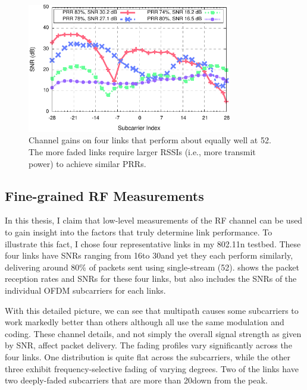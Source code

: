 \begin{figure}[t]
  \centering
  \includegraphics[width=0.8\textwidth]{figures/fsf_shape.pdf}
  \caption[Channel gains on four links that perform about equally well at 52\Mbps]{Channel gains on four links that perform about equally well at 52\Mbps. The more faded links require larger RSSIs (i.e., more transmit power) to achieve similar PRRs.}
  \label{fig:example_fsf_shape}

\end{figure}

\subsection{Fine-grained RF Measurements}
In this thesis, I claim that low-level measurements of the RF channel can be used to gain insight into the factors that truly determine link performance. To illustrate this fact, I chose four representative links in my 802.11n testbed. These four links have SNRs ranging from 16\dB to 30\dB and yet they each perform similarly, delivering around 80\% of packets sent using single-stream  (52\Mbps).  shows the packet reception rates and SNRs for these four links, but also includes the SNRs of the individual OFDM subcarriers for each links.

With this detailed picture, we can see that multipath causes some subcarriers to work markedly better than others although all use the same modulation and coding. These channel details, and not simply the overall signal strength as given by SNR, affect packet delivery. The fading profiles vary significantly across the four links. One distribution is quite flat across the subcarriers, while the other three exhibit frequency-selective fading of varying degrees. Two of the links have two deeply-faded subcarriers that are more than 20\dB down from the peak.

